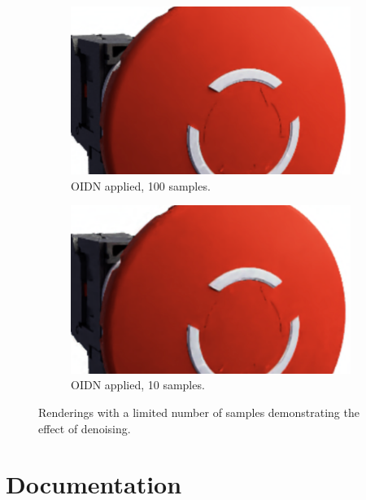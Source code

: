\begin{figure}[H]
\begin{subfigure}[t]{0.38\textwidth}
        \includegraphics[width=\textwidth]{resources/denoise-oidn-100-samples.png}
        \caption{\gls{OIDN} applied, 100 samples.}
        \label{fig:denoise-oidn-100-samples}
    \end{subfigure}
    \hfill
    \begin{subfigure}[t]{0.38\textwidth}
        \includegraphics[width=\textwidth]{resources/denoise-oidn-10-samples.png}
        \caption{\gls{OIDN} applied, 10 samples.}
        \label{fig:denoise-oidn-10-samples}
    \end{subfigure}
    \hspace*{0.8cm}
    \caption{Renderings with a limited number of samples demonstrating the effect of denoising.}
    \label{fig:denoise-samples}
\end{figure}

\newpage

\section{Documentation}


